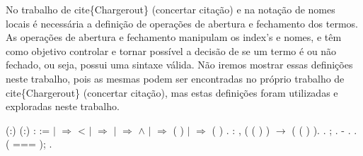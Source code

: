  No trabalho de cite\{Chargerout\} (concertar citação) e na notação de nomes locais é necessária a definição de operações de
abertura e fechamento dos termos. As operações de abertura e fechamento manipulam os index's e nomes, e têm como objetivo controlar
e tornar possível a decisão de se um termo é ou não fechado, ou seja, possui uma sintaxe válida. Não iremos mostrar essas definições
neste trabalho, pois as mesmas podem ser encontradas no próprio trabalho de cite\{Chargerout\} (concertar citação), mas estas definições
foram utilizadas e exploradas neste trabalho. \begin{coqdoccode}
\coqdocemptyline
\coqdocemptyline
\coqdocnoindent
{}  (:) (:) :  :=\coqdoceol
\coqdocindent{1.00em}
  \coqdoceol
\coqdocindent{1.00em}
\ensuremath{|}      \ensuremath{\Rightarrow}  < \coqdoceol
\coqdocindent{1.00em}
\ensuremath{|}      \ensuremath{\Rightarrow} \coqdoceol
\coqdocindent{1.00em}
\ensuremath{|}    \ensuremath{\Rightarrow}    \ensuremath{\land}   \coqdoceol
\coqdocindent{1.00em}
\ensuremath{|}      \ensuremath{\Rightarrow}  ( ) \coqdoceol
\coqdocindent{1.00em}
\ensuremath{|}      \ensuremath{\Rightarrow}  ( ) \coqdoceol
\coqdocindent{1.00em}
.\coqdoceol
\coqdocemptyline
\coqdocnoindent
{} : \coqdockw{\ensuremath{\forall}}     ,   (  ( ) ) \ensuremath{\rightarrow}   (  ( ) ).\coqdoceol
\coqdocnoindent
{}.\coqdoceol
\coqdocindent{1.00em}
 ;  .\coqdoceol
\coqdocindent{1.00em}
-     .\coqdoceol
\coqdocindent{2.00em}
.  ( === ); .\coqdoceol

\end{coqdoccode}
